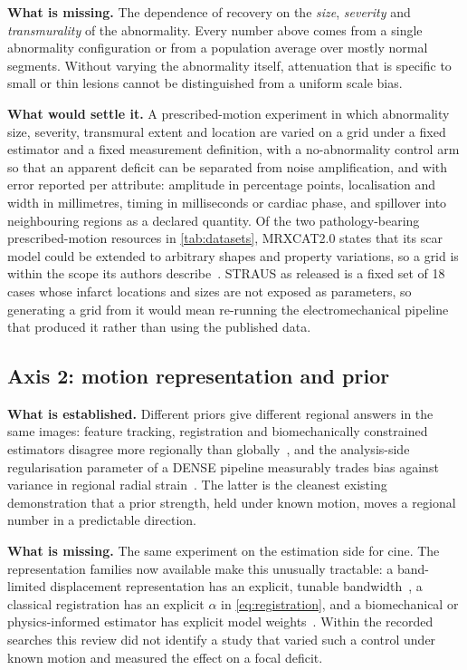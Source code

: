 \textbf{What is missing.} The dependence of recovery on the \emph{size}, \emph{severity} and
\emph{transmurality} of the abnormality. Every number above comes from a single abnormality
configuration or from a population average over mostly normal segments. Without varying the
abnormality itself, attenuation that is specific to small or thin lesions cannot be distinguished
from a uniform scale bias.

\textbf{What would settle it.} A prescribed-motion experiment in which abnormality size, severity,
transmural extent and location are varied on a grid under a fixed estimator and a fixed measurement
definition, with a no-abnormality control arm so that an apparent deficit can be separated from
noise amplification, and with error reported per attribute: amplitude in percentage points,
localisation and width in millimetres, timing in milliseconds or cardiac phase, and spillover into
neighbouring regions as a declared quantity. Of the two pathology-bearing prescribed-motion
resources in \cref{tab:datasets}, MRXCAT2.0 states that its scar model could be extended to
arbitrary shapes and property variations, so a grid is within the scope its authors
describe~\citep{mrxcat2023}. STRAUS as released is a fixed set of 18 cases whose infarct locations
and sizes are not exposed as parameters, so generating a grid from it would mean re-running the
electromechanical pipeline that produced it rather than using the published data.

\subsection{Axis 2: motion representation and prior}\label{sec:axis_prior}

\textbf{What is established.} Different priors give different regional answers in the same images:
feature tracking, registration and biomechanically constrained estimators disagree more regionally
than globally~\citep{militaru2021,goetze2026}, and the analysis-side regularisation parameter of a
DENSE pipeline measurably trades bias against variance in regional radial
strain~\citep{barbaroux2025}. The latter is the cleanest existing demonstration that a prior
strength, held under known motion, moves a regional number in a predictable direction.

\textbf{What is missing.} The same experiment on the estimation side for cine. The representation
families now available make this unusually tractable: a band-limited displacement representation has
an explicit, tunable bandwidth~\citep{jia2023fouriernet,jia2026fouriernetplus}, a classical
registration has an explicit $\alpha$ in \cref{eq:registration}, and a biomechanical or
physics-informed estimator has explicit model weights~\citep{qin2023biomech,arratia2023warppinn,liu2026fe}.
Within the recorded searches this review did not identify a study that varied such a control under known
motion and measured the effect on a focal deficit.

